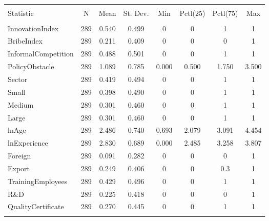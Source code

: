 \begin{table}[H] \centering 
  \caption*{} 
\begin{tabular}{@{\extracolsep{5pt}}lccccccc} 
\\[-1.8ex]\hline 
\hline \\[-1.8ex] 
Statistic & \multicolumn{1}{c}{N} & \multicolumn{1}{c}{Mean} & \multicolumn{1}{c}{St. Dev.} & \multicolumn{1}{c}{Min} & \multicolumn{1}{c}{Pctl(25)} & \multicolumn{1}{c}{Pctl(75)} & \multicolumn{1}{c}{Max} \\ 
\hline \\[-1.8ex] 
InnovationIndex & 289 & 0.540 & 0.499 & 0 & 0 & 1 & 1 \\ 
BribeIndex & 289 & 0.211 & 0.409 & 0 & 0 & 0 & 1 \\ 
InformalCompetition & 289 & 0.488 & 0.501 & 0 & 0 & 1 & 1 \\ 
PolicyObstacle & 289 & 1.089 & 0.785 & 0.000 & 0.500 & 1.750 & 3.500 \\ 
Sector & 289 & 0.419 & 0.494 & 0 & 0 & 1 & 1 \\ 
Small & 289 & 0.398 & 0.490 & 0 & 0 & 1 & 1 \\ 
Medium & 289 & 0.301 & 0.460 & 0 & 0 & 1 & 1 \\ 
Large & 289 & 0.301 & 0.460 & 0 & 0 & 1 & 1 \\ 
lnAge & 289 & 2.486 & 0.740 & 0.693 & 2.079 & 3.091 & 4.454 \\ 
lnExperience & 289 & 2.830 & 0.689 & 0.000 & 2.485 & 3.258 & 3.807 \\ 
Foreign & 289 & 0.091 & 0.282 & 0 & 0 & 0 & 1 \\ 
Export & 289 & 0.249 & 0.406 & 0 & 0 & 0.3 & 1 \\ 
TrainingEmployees & 289 & 0.429 & 0.496 & 0 & 0 & 1 & 1 \\ 
R\&D & 289 & 0.225 & 0.418 & 0 & 0 & 0 & 1 \\ 
QualityCertificate & 289 & 0.270 & 0.445 & 0 & 0 & 1 & 1 \\ 
\hline \\[-1.8ex] 
\end{tabular} 
\end{table} 

